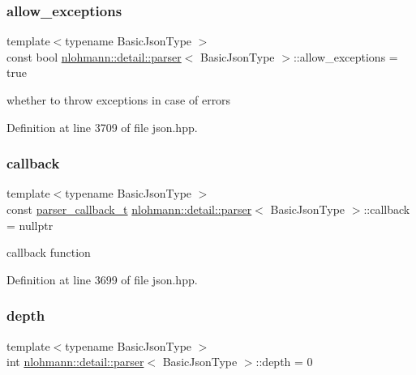 \subsubsection{\texorpdfstring{allow\+\_\+exceptions}{allow\_exceptions}}
{\footnotesize\ttfamily template$<$typename Basic\+Json\+Type $>$ \\
const bool \hyperlink{classnlohmann_1_1detail_1_1parser}{nlohmann\+::detail\+::parser}$<$ Basic\+Json\+Type $>$\+::allow\+\_\+exceptions = true\hspace{0.3cm}{\ttfamily [private]}}



whether to throw exceptions in case of errors 



Definition at line 3709 of file json.\+hpp.

\mbox{\label{classnlohmann_1_1detail_1_1parser_a7600d272ec605e3ffdc8512b3585f476}} 
\subsubsection{\texorpdfstring{callback}{callback}}
{\footnotesize\ttfamily template$<$typename Basic\+Json\+Type $>$ \\
const \hyperlink{classnlohmann_1_1detail_1_1parser_ad250ad4f2b4af4a497e727c963162ff1}{parser\+\_\+callback\+\_\+t} \hyperlink{classnlohmann_1_1detail_1_1parser}{nlohmann\+::detail\+::parser}$<$ Basic\+Json\+Type $>$\+::callback = nullptr\hspace{0.3cm}{\ttfamily [private]}}



callback function 



Definition at line 3699 of file json.\+hpp.

\mbox{\label{classnlohmann_1_1detail_1_1parser_a49dca6af052e9cab3a48dc1eaa163063}} 
\subsubsection{\texorpdfstring{depth}{depth}}
{\footnotesize\ttfamily template$<$typename Basic\+Json\+Type $>$ \\
int \hyperlink{classnlohmann_1_1detail_1_1parser}{nlohmann\+::detail\+::parser}$<$ Basic\+Json\+Type $>$\+::depth = 0\hspace{0.3cm}{\ttfamily [private]}}



